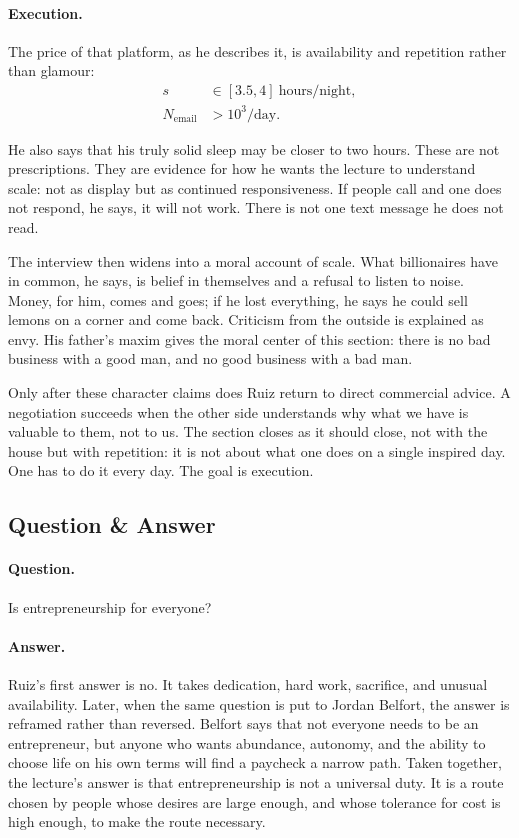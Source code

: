 \paragraph{Execution.}
The price of that platform, as he describes it, is availability and repetition rather than glamour:
\begin{align}
s &\in [3.5,4]\ \text{hours/night},\\
N_{\text{email}} &> 10^3/\text{day}.
\end{align}

He also says that his truly solid sleep may be closer to two hours. These are not prescriptions. They are evidence for how he wants the lecture to understand scale: not as display but as continued responsiveness. If people call and one does not respond, he says, it will not work. There is not one text message he does not read.

The interview then widens into a moral account of scale. What billionaires have in common, he says, is belief in themselves and a refusal to listen to noise. Money, for him, comes and goes; if he lost everything, he says he could sell lemons on a corner and come back. Criticism from the outside is explained as envy. His father's maxim gives the moral center of this section: there is no bad business with a good man, and no good business with a bad man.

Only after these character claims does Ruiz return to direct commercial advice. A negotiation succeeds when the other side understands why what we have is valuable to them, not to us. The section closes as it should close, not with the house but with repetition: it is not about what one does on a single inspired day. One has to do it every day. The goal is execution.

\subsection{Question \& Answer}

\paragraph{Question.}
Is entrepreneurship for everyone?

\paragraph{Answer.}
Ruiz's first answer is no. It takes dedication, hard work, sacrifice, and unusual availability. Later, when the same question is put to Jordan Belfort, the answer is reframed rather than reversed. Belfort says that not everyone needs to be an entrepreneur, but anyone who wants abundance, autonomy, and the ability to choose life on his own terms will find a paycheck a narrow path. Taken together, the lecture's answer is that entrepreneurship is not a universal duty. It is a route chosen by people whose desires are large enough, and whose tolerance for cost is high enough, to make the route necessary.


